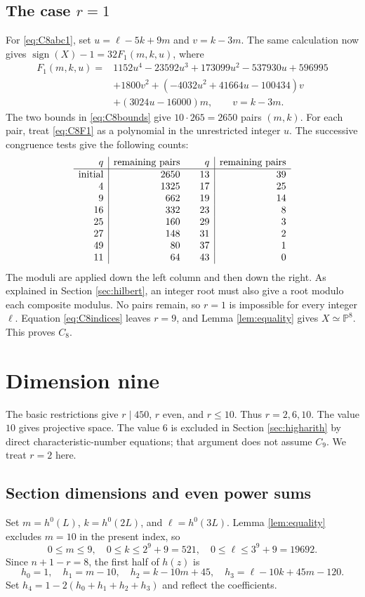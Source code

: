 \documentclass[11pt,reqno,letterpaper]{amsart}
\newcommand{\PP}{\mathbb P}
\newcommand{\sgn}{\operatorname{sign}}
\theoremstyle{definition}
\numberwithin{equation}{section}
\begin{document}
\subsection{The case \texorpdfstring{$r=1$}{r=1}}
For \eqref{eq:C8abc1}, set $u=\ell-5k+9m$ and $v=k-3m$.
The same calculation now gives $\sgn(X)-1=32F_1(m,k,u)$, where
\begin{align}
 F_1(m,k,u)={}&1152u^4-23592u^3+173099u^2-537930u+596995\nonumber\\
 &+1800v^2+(-4032u^2+41664u-100434)v\nonumber\\
 &+(3024u-16000)m,\qquad v=k-3m.\label{eq:C8F1}
\end{align}
The two bounds in \eqref{eq:C8bounds} give $10\cdot265=2650$ pairs $(m,k)$.
For each pair, treat \eqref{eq:C8F1} as a polynomial in the unrestricted
integer $u$. The successive congruence tests give the following counts:
\[
\begin{array}{r|r@{\qquad}r|r}
q&\text{remaining pairs}&q&\text{remaining pairs}\\ \hline
\text{initial}&2650&13&39\\
4&1325&17&25\\
9&662&19&14\\
16&332&23&8\\
25&160&29&3\\
27&148&31&2\\
49&80&37&1\\
11&64&43&0
\end{array}
\]
The moduli are applied down the left column and then down the right.
As explained in Section \ref{sec:hilbert}, an integer root must also
give a root modulo each composite modulus. No pairs remain, so $r=1$
is impossible for every integer $\ell$.
Equation \eqref{eq:C8indices} leaves $r=9$, and Lemma \ref{lem:equality}
gives $X\simeq\PP^8$. This proves $C_8$.

\section{Dimension nine}\label{sec:C9}
The basic restrictions give $r\mid450$, $r$ even, and $r\le10$.
Thus $r=2,6,10$. The value $10$ gives projective space.
The value $6$ is excluded in Section \ref{sec:higharith} by direct
characteristic-number equations; that argument does not assume $C_9$.
We treat $r=2$ here.

\subsection{Section dimensions and even power sums}
Set $m=h^0(L)$, $k=h^0(2L)$, and $\ell=h^0(3L)$.
Lemma \ref{lem:equality} excludes $m=10$ in the present index, so
\begin{equation}\label{eq:C9bounds}
 0\le m\le9,\quad 0\le k\le 2^9+9=521,\quad
 0\le\ell\le3^9+9=19692.
\end{equation}
Since $n+1-r=8$, the first half of $h(z)$ is
\[
 h_0=1,\quad h_1=m-10,\quad h_2=k-10m+45,\quad
 h_3=\ell-10k+45m-120.
\]
Set $h_4=1-2(h_0+h_1+h_2+h_3)$ and reflect the coefficients.
\end{document}
